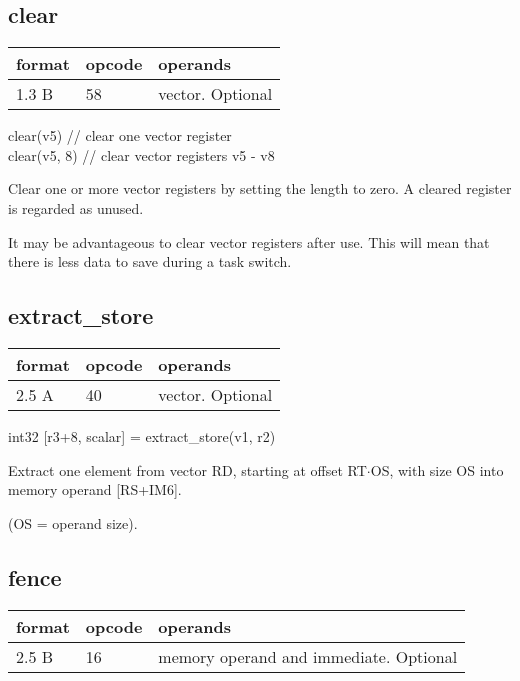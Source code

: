 \documentclass[forwardcom.tex]{subfiles}
\begin{document}
\subsection{clear}
\label{table:clearInstruction}
\begin{tabular}{|p{12mm}|p{15mm}|p{100mm}|}
\hline
\bfseries format & \bfseries opcode & \bfseries operands \\ \hline
1.3 B & 58 & vector. Optional \\ \hline
\end{tabular}
\vv

clear(v5)      // clear one vector register \\
clear(v5, 8)   // clear vector registers v5 - v8
\vv

Clear one or more vector registers by setting the length to zero. A cleared register is regarded as unused.
\vv

It may be advantageous to clear vector registers after use. This will mean that there is less data to save during a task switch.
\vv


\subsection{extract\_store}
\label{table:extractStoreInstruction}
\begin{tabular}{|p{12mm}|p{15mm}|p{100mm}|}
\hline
\bfseries format & \bfseries opcode & \bfseries operands \\ \hline
2.5 A & 40 & vector. Optional \\ \hline
\end{tabular}
\vv

int32 [r3+8, scalar] = extract\_store(v1, r2)
\vv

Extract one element from vector RD, starting at offset RT$\cdot$OS, with size OS into memory operand [RS+IM6].

(OS = operand size).


\subsection{fence}
\label{table:fenceInstruction}
\begin{tabular}{|p{12mm}|p{15mm}|p{100mm}|}
\hline
\bfseries format & \bfseries opcode & \bfseries operands \\ \hline
2.5 B & 16 & memory operand and immediate. Optional \\ \hline
\end{tabular}
\vv
\end{document}

